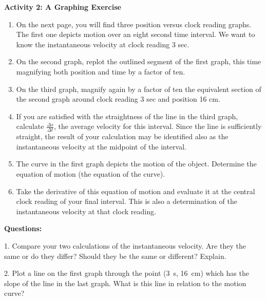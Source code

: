{\noindent \bf Activity 2: A Graphing Exercise} \begin{enumerate}

\item On the next page, you will find three position versus clock reading graphs. The first one depicts motion over an eight second time interval. We want to know the instantaneous velocity at clock reading 3 sec.

\item On the second graph, replot the outlined segment of the first graph, this time magnifying both position and time by a factor of ten.

\item On the third graph, magnify again by a factor of ten the equivalent section of the second graph around clock reading 3 sec and position 16 cm. 

\item If you are satisfied with the straightness of the line in the third graph, calculate $\frac{\Delta s}{\Delta t}$, the average velocity for this interval. Since the line is sufficiently straight, the result of your calculation may be identified also as the instantaneous velocity at the midpoint of the interval.

\item The curve in the first graph depicts the motion of the object. Determine the equation of motion (the equation of the curve).

\item Take the derivative of this equation of motion and evaluate it at the central clock reading of your final interval. This is also a determination of the instantaneous velocity at that clock reading.

\end{enumerate}

\medskip

{\noindent \bf Questions:}

1. Compare your two calculations of the instantaneous velocity. Are they the
same or do they differ? Should they be the same or different? Explain. 
\answerspace{20mm}

2. Plot a line on the first graph through the point (3~s, 16~cm) which has the
slope of the line in the last graph. What is this line in relation to the motion
curve?
\answerspace{20mm}

\pagebreak[2]

